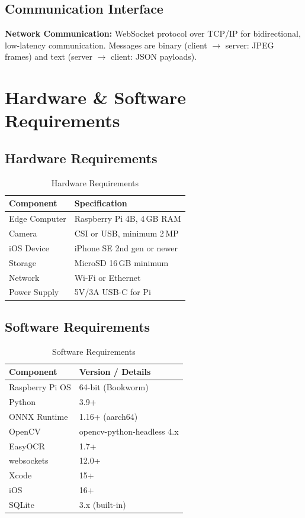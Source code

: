 \subsection{Communication Interface}
\textbf{Network Communication:} WebSocket protocol over TCP/IP for bidirectional, low-latency communication. Messages are binary (client $\to$ server: JPEG frames) and text (server $\to$ client: JSON payloads).

\section{Hardware \& Software Requirements}
\subsection{Hardware Requirements}
\begin{table}[H]
\centering
\caption{Hardware Requirements}
\renewcommand{\arraystretch}{1.3}
\begin{tabular}{|l|l|}
\hline
\textbf{Component} & \textbf{Specification} \\
\hline
Edge Computer & Raspberry Pi 4B, 4\,GB RAM \\
\hline
Camera & CSI or USB, minimum 2\,MP \\
\hline
iOS Device & iPhone SE 2nd gen or newer \\
\hline
Storage & MicroSD 16\,GB minimum \\
\hline
Network & Wi-Fi or Ethernet \\
\hline
Power Supply & 5V/3A USB-C for Pi \\
\hline
\end{tabular}
\end{table}

\subsection{Software Requirements}
\begin{table}[H]
\centering
\caption{Software Requirements}
\renewcommand{\arraystretch}{1.3}
\begin{tabular}{|l|l|}
\hline
\textbf{Component} & \textbf{Version / Details} \\
\hline
Raspberry Pi OS & 64-bit (Bookworm) \\
\hline
Python & 3.9+ \\
\hline
ONNX Runtime & 1.16+ (aarch64) \\
\hline
OpenCV & opencv-python-headless 4.x \\
\hline
EasyOCR & 1.7+ \\
\hline
websockets & 12.0+ \\
\hline
Xcode & 15+ \\
\hline
iOS & 16+ \\
\hline
SQLite & 3.x (built-in) \\
\hline
\end{tabular}
\end{table}

